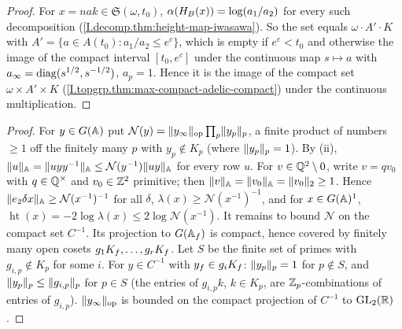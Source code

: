 \begin{theorem}
\end{theorem}
\begin{proof}
For $x=nak\in\mathfrak S(\omega,t_0)$, $\alpha(H_B(x))=\log(a_1/a_2)$ for every such decomposition (\cref{I.decomp.thm:height-map-iwasawa}). So the
set equals $\omega\cdot A'\cdot K$ with $A'=\{a\in A(t_0):a_1/a_2\le e^c\}$, which is empty if $e^c<t_0$ and otherwise the image of the
compact interval $[t_0,e^c]$ under the continuous map $s\mapsto a$ with $a_\infty=\operatorname{diag}(s^{1/2},s^{-1/2})$, $a_p=1$. Hence it is the image of
the compact set $\omega\times A'\times K$ (\cref{I.topgrp.thm:max-compact-adelic-compact}) under the continuous multiplication.
\end{proof}

\begin{lemma}
\end{lemma}
\begin{proof}
For $y\in G(\mathbb{A})$ put $\mathcal N(y)=\lVert y_\infty\rVert_{\mathrm{op}}\prod_p\lVert y_p\rVert_p$, a finite product of numbers $\ge1$ off the finitely many $p$ with
$y_p\notin K_p$ (where $\lVert y_p\rVert_p=1$). By (ii), $\lVert u\rVert_{\mathbb{A}}=\lVert uyy^{-1}\rVert_{\mathbb{A}}\le\mathcal N(y^{-1})\lVert uy\rVert_{\mathbb{A}}$ for every row $u$. For
$v\in\mathbb{Q}^2\setminus0$, write $v=qv_0$ with $q\in\mathbb{Q}^\times$ and $v_0\in\mathbb{Z}^2$ primitive; then $\lVert v\rVert_{\mathbb{A}}=\lVert v_0\rVert_{\mathbb{A}}=\lVert v_0\rVert_2\ge1$. Hence
$\lVert e_2\delta x\rVert_{\mathbb{A}}\ge\mathcal N(x^{-1})^{-1}$ for all $\delta$, $\lambda(x)\ge\mathcal N(x^{-1})^{-1}$, and for $x\in G(\mathbb{A})^1$,
$\operatorname{ht}(x)=-2\log\lambda(x)\le2\log\mathcal N(x^{-1})$. It remains to bound $\mathcal N$ on the compact set $C^{-1}$. Its projection to
$G(\mathbb{A}_f)$ is compact, hence covered by finitely many open cosets $g_1K_f,\dots,g_rK_f$. Let $S$ be the finite set of primes with
$g_{i,p}\notin K_p$ for some $i$. For $y\in C^{-1}$ with $y_f\in g_iK_f$: $\lVert y_p\rVert_p=1$ for $p\notin S$, and
$\lVert y_p\rVert_p\le\lVert g_{i,p}\rVert_p$ for $p\in S$ (the entries of $g_{i,p}k$, $k\in K_p$, are $\mathbb{Z}_p$-combinations of entries of $g_{i,p}$).
$\lVert y_\infty\rVert_{\mathrm{op}}$ is bounded on the compact projection of $C^{-1}$ to $\mathrm{GL}_2(\mathbb{R})$.
\end{proof}


